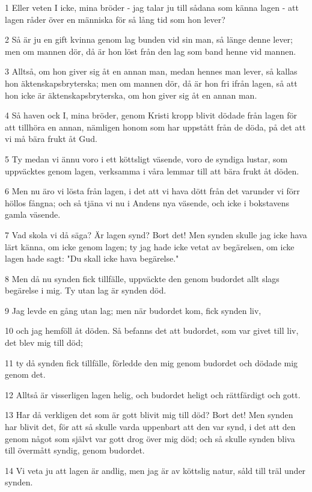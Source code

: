\par 1 Eller veten I icke, mina bröder - jag talar ju till sådana som känna lagen - att lagen råder över en människa för så lång tid som hon lever?
\par 2 Så är ju en gift kvinna genom lag bunden vid sin man, så länge denne lever; men om mannen dör, då är hon löst från den lag som band henne vid mannen.
\par 3 Alltså, om hon giver sig åt en annan man, medan hennes man lever, så kallas hon äktenskapsbryterska; men om mannen dör, då är hon fri ifrån lagen, så att hon icke är äktenskapsbryterska, om hon giver sig åt en annan man.
\par 4 Så haven ock I, mina bröder, genom Kristi kropp blivit dödade från lagen för att tillhöra en annan, nämligen honom som har uppstått från de döda, på det att vi må bära frukt åt Gud.
\par 5 Ty medan vi ännu voro i ett köttsligt väsende, voro de syndiga lustar, som uppväcktes genom lagen, verksamma i våra lemmar till att bära frukt åt döden.
\par 6 Men nu äro vi lösta från lagen, i det att vi hava dött från det varunder vi förr höllos fångna; och så tjäna vi nu i Andens nya väsende, och icke i bokstavens gamla väsende.
\par 7 Vad skola vi då säga? Är lagen synd? Bort det! Men synden skulle jag icke hava lärt känna, om icke genom lagen; ty jag hade icke vetat av begärelsen, om icke lagen hade sagt: "Du skall icke hava begärelse."
\par 8 Men då nu synden fick tillfälle, uppväckte den genom budordet allt slags begärelse i mig. Ty utan lag är synden död.
\par 9 Jag levde en gång utan lag; men när budordet kom, fick synden liv,
\par 10 och jag hemföll åt döden. Så befanns det att budordet, som var givet till liv, det blev mig till död;
\par 11 ty då synden fick tillfälle, förledde den mig genom budordet och dödade mig genom det.
\par 12 Alltså är visserligen lagen helig, och budordet heligt och rättfärdigt och gott.
\par 13 Har då verkligen det som är gott blivit mig till död? Bort det! Men synden har blivit det, för att så skulle varda uppenbart att den var synd, i det att den genom något som självt var gott drog över mig död; och så skulle synden bliva till övermått syndig, genom budordet.
\par 14 Vi veta ju att lagen är andlig, men jag är av köttslig natur, såld till träl under synden.
